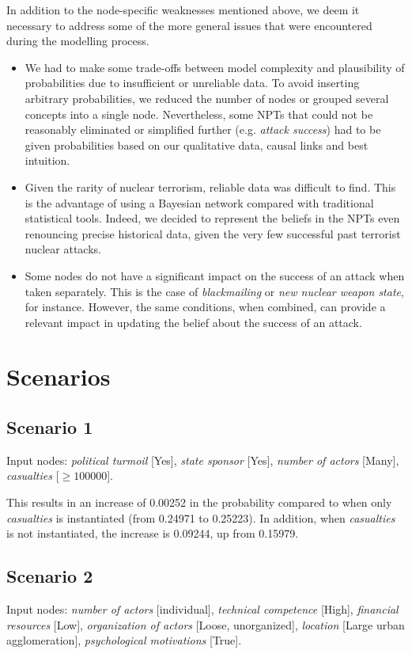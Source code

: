 \documentclass{article}
\begin{document}
{\noindent In addition to the node-specific weaknesses mentioned above, we deem it necessary to address some of the more general issues that were encountered during the modelling process. 
\begin{itemize}
    \item     We had to make some trade-offs between model complexity and plausibility of probabilities due to insufficient or unreliable data. To avoid inserting arbitrary probabilities, we reduced the number of nodes or grouped several concepts into a single node. Nevertheless, some NPTs that could not be reasonably eliminated or simplified further (e.g. \textit{attack success}) had to be given probabilities based on our qualitative data, causal links and best intuition. 

    \item     Given the rarity of nuclear terrorism, reliable data was difficult to find. This is the advantage of using a Bayesian network compared with traditional statistical tools. Indeed, we decided to represent the beliefs in the NPTs even renouncing precise historical data, given the very few successful past terrorist nuclear attacks. 

    \item     Some nodes do not have a significant impact on the success of an attack when taken separately. This is the case of \textit{blackmailing} or \textit{new nuclear weapon state}, for instance. However, the same conditions, when combined, can provide a relevant impact in updating the belief about the success of an attack.  
\end{itemize} 
\section{Scenarios}
\subsection{Scenario 1}
Input nodes: \textit{political turmoil} [Yes], \textit{state sponsor} [Yes], \textit{number of actors} [Many], \textit{casualties} [$\geq100000$]. 

\noindent This results in an increase of 0.00252 in the probability compared to when only \textit{casualties} is instantiated (from 0.24971 to 0.25223). In addition, when \textit{casualties} is not instantiated, the increase is 0.09244, up from 0.15979. 

\subsection{Scenario 2}
Input nodes: \textit{number of actors} [individual], \textit{technical competence} [High], \textit{financial resources} [Low], \textit{organization of actors} [Loose, unorganized], \textit{location} [Large urban agglomeration], \textit{psychological motivations} [True].

}
\end{document}
